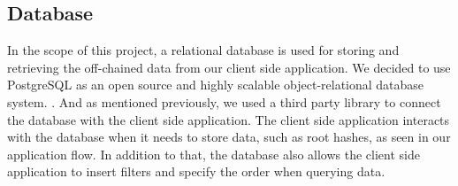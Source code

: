 \subsection{Database}
\label{subsec:approach-database}

In the scope of this project, a relational database is used for storing and retrieving the off-chained data from our client side application. We decided to use PostgreSQL as an open source and highly scalable object-relational database system. \cite{relatedWork35}. And as mentioned previously, we used a third party library to connect the database with the client side application. The client side application interacts with the database when it needs to store data, such as root hashes, as seen in our application flow. In addition to that, the database also allows the client side application to insert filters and specify the order when querying data.
